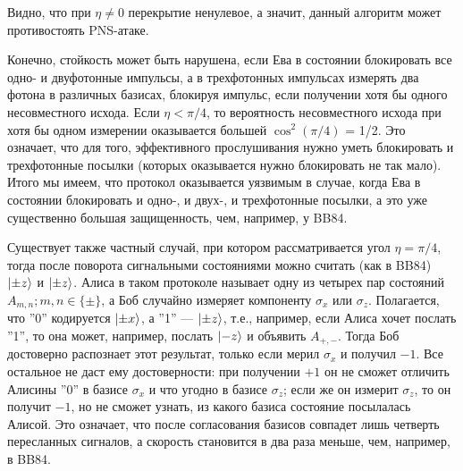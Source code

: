 \documentclass[a4paper, 12pt]{article}
\begin{document}
Видно, что при $\eta \ne 0$ перекрытие ненулевое, а значит, данный алгоритм может противостоять PNS-атаке.

Конечно, стойкость может быть нарушена, если Ева в состоянии блокировать все одно- и двуфотонные импульсы, а в трехфотонных импульсах измерять два фотона в различных базисах, блокируя импульс, если получении хотя бы одного несовместного исхода. Если $\eta < \pi/4$, то вероятность несовместного исхода при хотя бы одном измерении оказывается большей $\cos^2 (\pi/4)$ = 1/2. Это означает, что для того, эффективного прослушивания нужно уметь блокировать и трехфотонные посылки (которых оказывается нужно блокировать не так мало). Итого мы имеем, что протокол оказывается уязвимым в случае, когда Ева в состоянии блокировать и одно-, и двух-, и трехфотонные посылки, а это уже существенно большая защищенность, чем, например, у BB84.

Существует также частный случай, при котором рассматривается угол $\eta = \pi/4$, тогда после поворота сигнальными состояниями можно считать (как в BB84) $\ket{\pm z}$ и $\ket{\pm z}$. Алиса в таком протоколе называет одну из четырех пар состояний $A_{m, n}; m, n \in \{\pm\}$, а Боб случайно измеряет компоненту $\sigma_x$ или $\sigma_z$. Полагается, что ''0'' кодируется $\ket{\pm x}$, а ''1'' --- $\ket{\pm z}$, т.е., например, если Алиса хочет послать ''1'', то она может, например, послать $\ket{-z}$ и объявить $A_{+, -}$. Тогда Боб достоверно распознает этот результат, только если мерил $\sigma_x$ и получил $-1$. Все остальное не даст ему достоверности: при получении $+1$ он не сможет отличить Алисины ''0'' в базисе $\sigma_x$ и что угодно в базисе $\sigma_z$; если же он измерит $\sigma_z$, то он получит $-1$, но не сможет узнать, из какого базиса состояние посылалась Алисой. Это означает, что после согласования базисов совпадет лишь четверть пересланных сигналов, а скорость становится в два раза меньше, чем, например, в BB84.
\end{document}
